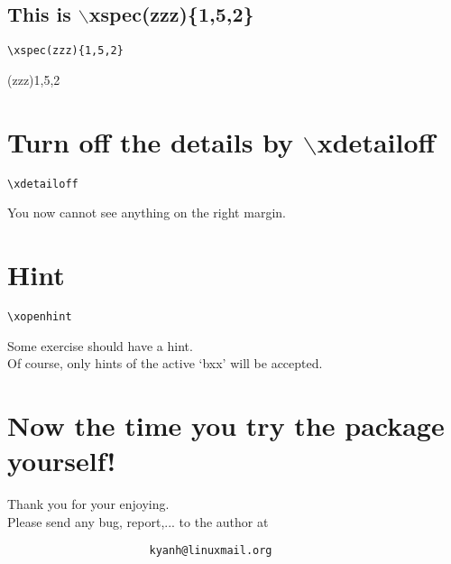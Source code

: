 \documentclass{article}
\def\back:{$\backslash$}
\begin{document}
\subsection{This is \back:xspec(zzz)\{1,5,2\}}
\begin{verbatim}
\xspec(zzz){1,5,2}
\end{verbatim}
\xspec(zzz){1,5,2}

\section{Turn off the details by \back:xdetailoff}
\xdetailoff
\begin{verbatim}
\xdetailoff
\end{verbatim}
You now cannot see anything on the right margin.

\section{Hint}
\begin{verbatim}
\xopenhint
\end{verbatim}
Some exercise should have a hint.\\
Of course, only hints of the active `bxx' will be accepted.
\xopenhint

\section{Now the time you try the package yourself!}
Thank you for your enjoying.\\[3mm]
Please send any bug, report,... to the author at
\begin{verbatim}
                      kyanh@linuxmail.org
\end{verbatim}
\end{document}
